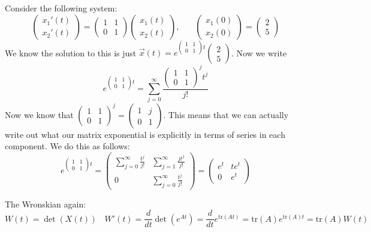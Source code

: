 \documentclass{article}
\theoremstyle{definition}
\begin{document}
        \begin{mdframed}[]
            Consider the following system:
            \[
                \begin{pmatrix}
                    x_1'(t)\\
                    x_2'(t)
                \end{pmatrix} = \begin{pmatrix}
                    1 & 1 \\ 0 & 1
                \end{pmatrix} \begin{pmatrix}
                    x_1(t) \\ x_2(t)
                \end{pmatrix}, \ \ \ \ \ \ \ \ \begin{pmatrix}
                    x_1(0) \\ x_2(0)
                \end{pmatrix} = \begin{pmatrix}
                    2 \\ 5
                \end{pmatrix}
            \]
            We know the solution to this is just $\vec x(t) = e^{\begin{pmatrix}1 & 1 \\0 & 1\end{pmatrix}t}\begin{pmatrix}
                2\\ 5
            \end{pmatrix}$. Now we write
            \[
                e^{\begin{pmatrix}1 & 1 \\0 & 1\end{pmatrix}t} = \sum_{j=0}^\infty \frac{\begin{pmatrix}1 & 1 \\0 & 1\end{pmatrix}^jt^j}{j!}
            \]
            Now we know that $\begin{pmatrix}1 & 1 \\0 & 1\end{pmatrix}^j = \begin{pmatrix}1 & j\\0 & 1\end{pmatrix}$.
            This means that we can actually write out what our matrix exponential is explicitly in terms of series in each component.
            We do this as follows:
            \[
                e^{\begin{pmatrix}1 & 1 \\0 & 1\end{pmatrix}t} =\begin{pmatrix}
                    \sum_{j=0}^\infty \frac{t^j}{j!} & \sum_{j=1}^\infty \frac{j t^j}{j!}\\
                    0 & \sum_{j=0}^\infty \frac{t^j}{j!} 
                \end{pmatrix} = \begin{pmatrix}
                    e^t & te^t \\
                    0 & e^t
                \end{pmatrix}
            \]
        \end{mdframed}
        The Wronskian again:
        \[
            W(t) = \det(X(t)) \ \ \ \ W'(t) = \frac{d}{dt}\det(e^{At}) = \frac{d}{dt}e^{\text{tr}(At)} = \text{tr}(A)e^{\text{tr}(A)t} = \text{tr}(A)W(t)
        \]
\end{document}
